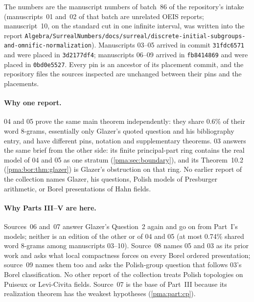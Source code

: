 \documentclass[11pt]{article}
\numberwithin{equation}{section}
\theoremstyle{definition}
\theoremstyle{remark}
\newcommand{\fn}[1]{\nolinkurl{#1}}
\begin{document}
The numbers are the manuscript numbers of batch~86 of the repository's
intake (manuscripts~01 and~02 of that batch are unrelated OEIS reports;
manuscript~10, on the standard cut in one infinite interval, was written
into the report
\fn{Algebra/SurrealNumbers/docs/surreal/discrete-initial-subgroups-and-omnific-normalization}).
Manuscripts 03--05 arrived in commit \texttt{31fdc6571} and were placed in
\texttt{3d2177df4}; manuscripts 06--09 arrived in \texttt{fb8414869} and were
placed in \texttt{0bd0e5527}. Every pin is an ancestor of its placement
commit, and the repository files the sources inspected are unchanged between
their pins and the placements.

\paragraph{Why one report.} 04 and 05 prove the same main theorem
independently: they share 0.6\% of their word 8-grams, essentially only
Glazer's quoted question and his bibliography entry, and have different pins,
notation and supplementary theorems. 03 answers the same brief from the other
side: its finite principal-part ring contains the real model of 04 and 05 as
one stratum (\cref{pma:sec:boundary}), and its Theorem~10.2
(\cref{pma:bor:thm:glazer}) is Glazer's obstruction on that ring. No earlier
report of the collection names Glazer, his questions, Polish models of
Presburger arithmetic, or Borel presentations of Hahn fields.

\paragraph{Why Parts III--V are here.} Sources~06 and~07 answer Glazer's
Question~2 again and go on from Part~I's models; neither is an edition of the
other or of 04 and 05 (at most 0.74\% shared word 8-grams among manuscripts
03--10). Source~08 names 05 and 03 as its prior work and asks what local
compactness forces on every Borel ordered presentation; source~09 names them
too and asks the Polish-group question that follows 03's Borel
classification. No other report of the collection treats Polish topologies on
Puiseux or Levi-Civita fields. Source~07 is the base of Part~III because its
realization theorem has the weakest hypotheses (\cref{pma:part:cp}).
\end{document}
